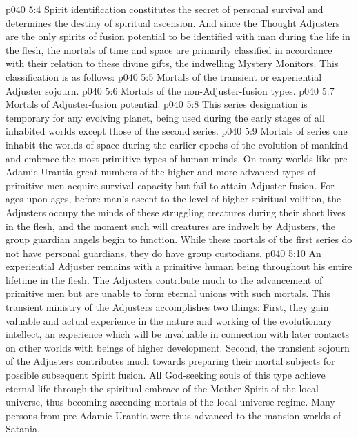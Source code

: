 \vs p040 5:4 \pc Spirit identification constitutes the secret of personal survival and determines the destiny of spiritual ascension. And since the Thought Adjusters are the only spirits of fusion potential to be identified with man during the life in the flesh, the mortals of time and space are primarily classified in accordance with their relation to these divine gifts, the indwelling Mystery Monitors. This classification is as follows:
\vs p040 5:5 \bibnobreakspace Mortals of the transient or experiential Adjuster sojourn.
\vs p040 5:6 \bibnobreakspace Mortals of the non\hyp{}Adjuster\hyp{}fusion types.
\vs p040 5:7 \bibnobreakspace Mortals of Adjuster\hyp{}fusion potential.
\vs p040 5:8 \pc {} This series designation is temporary for any evolving planet, being used during the early stages of all inhabited worlds except those of the second series.
\vs p040 5:9 Mortals of series one inhabit the worlds of space during the earlier epochs of the evolution of mankind and embrace the most primitive types of human minds. On many worlds like pre\hyp{}Adamic Urantia great numbers of the higher and more advanced types of primitive men acquire survival capacity but fail to attain Adjuster fusion. For ages upon ages, before man’s ascent to the level of higher spiritual volition, the Adjusters occupy the minds of these struggling creatures during their short lives in the flesh, and the moment such will creatures are indwelt by Adjusters, the group guardian angels begin to function. While these mortals of the first series do not have personal guardians, they do have group custodians.
\vs p040 5:10 An experiential Adjuster remains with a primitive human being throughout his entire lifetime in the flesh. The Adjusters contribute much to the advancement of primitive men but are unable to form eternal unions with such mortals. This transient ministry of the Adjusters accomplishes two things: First, they gain valuable and actual experience in the nature and working of the evolutionary intellect, an experience which will be invaluable in connection with later contacts on other worlds with beings of higher development. Second, the transient sojourn of the Adjusters contributes much towards preparing their mortal subjects for possible subsequent Spirit fusion. All God\hyp{}seeking souls of this type achieve eternal life through the spiritual embrace of the Mother Spirit of the local universe, thus becoming ascending mortals of the local universe regime. Many persons from pre\hyp{}Adamic Urantia were thus advanced to the mansion worlds of Satania.
